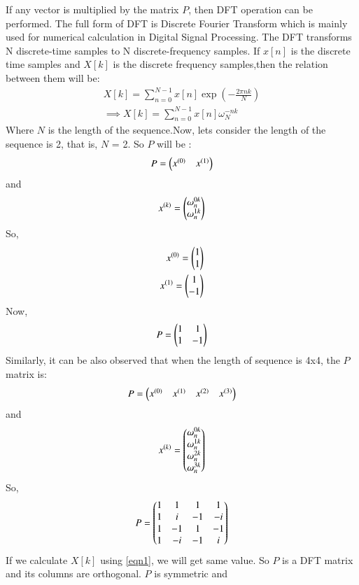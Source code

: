 \documentclass[journal,12pt,twocolumn]{IEEEtran}
\begin{document}
If any vector is multiplied by the matrix $P$, then DFT operation can be performed.
The full form of DFT is Discrete Fourier Transform which is mainly used for numerical calculation in Digital Signal Processing. The DFT transforms N discrete-time samples to N discrete-frequency samples. If $x[n]$ is the discrete time samples and $X[k]$ is the discrete frequency samples,then the relation between them will be:
\begin{align}
X[k] = \sum_{n=0}^{N-1} x[n] \exp{(-\frac{2\pi n k}{N})}\\
\implies  X[k] = \sum_{n=0}^{N-1} x[n] \omega_{N}^{-nk}
\label{eqn1}
\end{align}
Where $N$ is the length of the sequence.Now, lets consider the length of the sequence is 2, that is, $N$ = 2. So $P$ will be :
\begin{align}
P = \begin{pmatrix}x^{(0)} & x^{(1)}\end{pmatrix}
\end{align}
and 
\begin{align}
x^{(k)} = \begin{pmatrix}\omega_n^{0k}\\\omega_n^{1k}\end{pmatrix}
\end{align}
So,
\begin{align}
x^{(0)} = \begin{pmatrix}1\\1\end{pmatrix}\\
x^{(1)} = \begin{pmatrix}1\\-1\end{pmatrix}
\end{align}
Now, 
\begin{align}
P = \begin{pmatrix}1 & 1\\1 & -1\end{pmatrix}
\end{align}
Similarly, it can be also observed that when the length of sequence is 4x4,  the $P$ matrix is:
\begin{align}
P = \begin{pmatrix}x^{(0)} & x^{(1)} & x^{(2)} & x^{(3)}\end{pmatrix}
\end{align}
and 
\begin{align}
x^{(k)} = \begin{pmatrix}\omega_n^{0k}\\\omega_n^{1k}\\\omega_n^{2k}\\\omega_n^{3k}\end{pmatrix}
\end{align}
So, 
\begin{align}
P = \begin{pmatrix}1 & 1 & 1 & 1\\1 & i & -1 & -i\\1 & -1 & 1 & -1\\1 & -i & -1 & i\end{pmatrix}
\end{align}
If we calculate $X[k]$ using \ref{eqn1}, we will get same value.
So $P$ is a DFT matrix and its columns are orthogonal. $P$ is symmetric and
\end{document}
